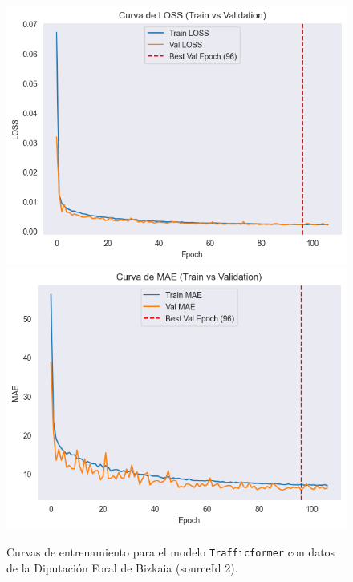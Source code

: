 \begin{figure}[H]
	\centering
	\caption{Curvas de entrenamiento para el modelo \texttt{Trafficformer} con datos de la Diputación Foral de Bizkaia (sourceId 2).}
	\begin{minipage}{0.48\textwidth}
		\centering
		\includegraphics[width=\linewidth]{includes/cap5/graphs/sid2_trafficformer_loss.png}
		\vspace{0.2cm}
		\includegraphics[width=\linewidth]{includes/cap5/graphs/sid2_trafficformer_mae.png}
		\vspace{0.2cm}

\end{minipage}
\end{figure}
